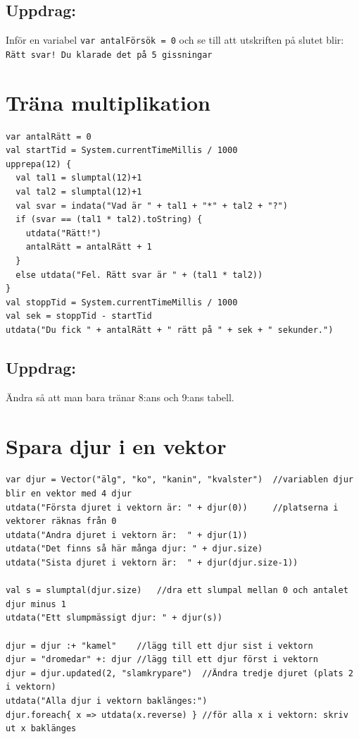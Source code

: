 \section*{\color{BrickRed}Uppdrag:}
Inför en variabel \lstinline{var antalFörsök = 0} och se till att utskriften på slutet blir:\\
\lstinline{Rätt svar! Du klarade det på 5 gissningar}
\chapter{Träna multiplikation}
\begin{lstlisting}[basicstyle={\ttfamily\fontsize{16}{19}\selectfont},numbers=none]
var antalRätt = 0
val startTid = System.currentTimeMillis / 1000
upprepa(12) {
  val tal1 = slumptal(12)+1
  val tal2 = slumptal(12)+1
  val svar = indata("Vad är " + tal1 + "*" + tal2 + "?")
  if (svar == (tal1 * tal2).toString) {
    utdata("Rätt!")
    antalRätt = antalRätt + 1
  }
  else utdata("Fel. Rätt svar är " + (tal1 * tal2))
}
val stoppTid = System.currentTimeMillis / 1000
val sek = stoppTid - startTid
utdata("Du fick " + antalRätt + " rätt på " + sek + " sekunder.")
\end{lstlisting}
        
\section*{\color{BrickRed}Uppdrag:}
Ändra så att man bara tränar 8:ans och 9:ans tabell.
\chapter{Spara djur i en vektor}
\begin{lstlisting}[basicstyle={\ttfamily\fontsize{14}{17}\selectfont},numbers=none]
var djur = Vector("älg", "ko", "kanin", "kvalster")  //variablen djur blir en vektor med 4 djur
utdata("Första djuret i vektorn är: " + djur(0))     //platserna i vektorer räknas från 0
utdata("Andra djuret i vektorn är:  " + djur(1))
utdata("Det finns så här många djur: " + djur.size)
utdata("Sista djuret i vektorn är:  " + djur(djur.size-1))

val s = slumptal(djur.size)   //dra ett slumpal mellan 0 och antalet djur minus 1
utdata("Ett slumpmässigt djur: " + djur(s))

djur = djur :+ "kamel"    //lägg till ett djur sist i vektorn
djur = "dromedar" +: djur //lägg till ett djur först i vektorn
djur = djur.updated(2, "slamkrypare")  //Ändra tredje djuret (plats 2 i vektorn)
utdata("Alla djur i vektorn baklänges:")
djur.foreach{ x => utdata(x.reverse) } //för alla x i vektorn: skriv ut x baklänges
\end{lstlisting}
        
